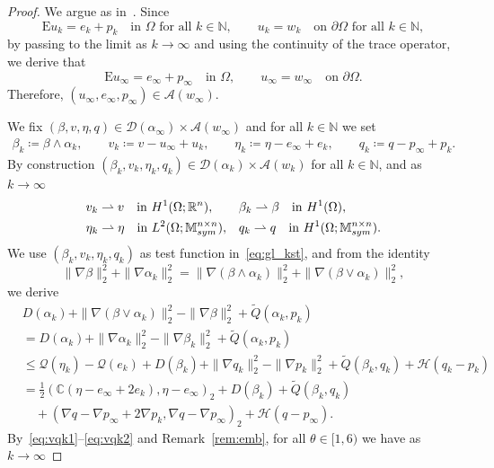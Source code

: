 \documentclass[reqno]{amsart}
\theoremstyle{definition}
\numberwithin{equation}{section}
\def\R {\mathbb R}
\def\N {\mathbb N}
\def\M {\mathbb M^{n\times n}_{\rm sym}}
\def\C {\mathbb C}
\def\EE {\mathrm{E}}
\begin{document}
\begin{proof}
We argue as in~\cite[Theorem 3.6]{Cr1}. Since
$$\EE u_k=e_k+p_k\quad\text{in $\Omega$ for all $k\in\N$},\qquad u_k=w_k\quad\text{on $\partial\Omega$ for all $k\in\N$},$$
by passing to the limit as $k\to\infty$ and using the continuity of the trace operator, we derive that 
$$\EE u_\infty=e_\infty+p_\infty\quad\text{in $\Omega$},\qquad u_\infty=w_\infty\quad\text{on $\partial\Omega$}.$$
Therefore, $(u_\infty,e_\infty,p_\infty)\in\mathcal A(w_\infty)$. 

We fix $(\beta,v,\eta,q)\in\mathcal D(\alpha_\infty)\times \mathcal A(w_\infty)$ and for all $k\in\N$ we set
\begin{align*}
\beta_k\coloneqq \beta\wedge\alpha_k,\qquad v_k\coloneqq v-u_\infty+u_k,\qquad\eta_k\coloneqq \eta-e_\infty+e_k,\qquad q_k\coloneqq q-p_\infty+p_k.
\end{align*}
By construction $(\beta_k,v_k,\eta_k,q_k)\in\mathcal D(\alpha_k)\times \mathcal A(w_k)$ for all $k\in\mathbb N$, and as $k\to\infty$
\begin{align}
   &v_k\rightharpoonup v\quad\text{in $H^1(\Omega;\R^n)$}, & &\beta_k\rightharpoonup \beta \quad\text{in $H^1(\Omega)$},\label{eq:vqk1}\\
   &\eta_k\rightharpoonup \eta\quad\text{in $L^2(\Omega;\M)$}, & &q_k\rightharpoonup q\quad\text{in $H^1(\Omega;\M)$}.\label{eq:vqk2}
\end{align}
We use $(\beta_k,v_k,\eta_k,q_k)$ as test function in~\eqref{eq:gl_kst}, and from the identity
$$\|\nabla \beta\|_2^2+\|\nabla \alpha_k\|_2^2=\|\nabla (\beta\wedge\alpha_k)\|_2^2+\|\nabla (\beta\vee\alpha_k)\|_2^2,$$
we derive
\begin{align}
&D(\alpha_k)+\|\nabla (\beta\vee \alpha_k)\|_2^2-\|\nabla \beta\|_2^2+\tilde Q(\alpha_k,p_k)\nonumber\\
&=D(\alpha_k)+\|\nabla \alpha_k\|_2^2-\|\nabla \beta_k\|_2^2+\tilde Q(\alpha_k,p_k)\nonumber\\
&\le \mathcal Q(\eta_k)-\mathcal Q(e_k)+D(\beta_k)+\|\nabla q_k\|_2^2-\|\nabla p_k\|_2^2+\tilde Q(\beta_k,q_k)+\mathcal H(q_k-p_k)\nonumber\\
&=\frac{1}{2}(\C(\eta-e_\infty+2e_k),\eta-e_\infty)_2+D(\beta_k)+\tilde Q(\beta_k,q_k)\nonumber\\
&\quad+(\nabla q-\nabla p_\infty+2\nabla p_k,\nabla q-\nabla p_\infty)_2+\mathcal H(q-p_\infty).\label{eq:minvqk}
\end{align}
By~\eqref{eq:vqk1}--\eqref{eq:vqk2} and Remark~\ref{rem:emb}, for all $\theta\in[1,6)$ we have as $k\to\infty$

\end{proof}
\end{document}
